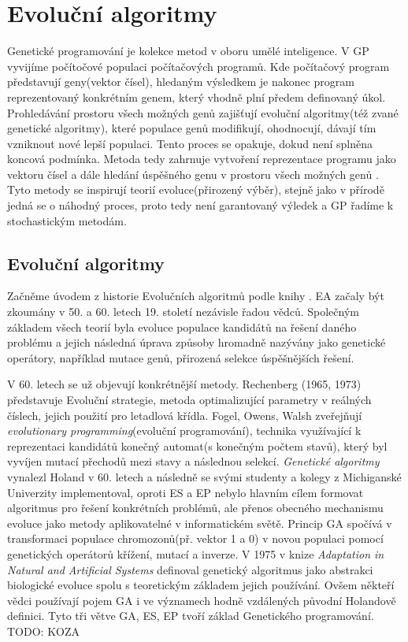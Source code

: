\chapter{Evoluční algoritmy}
Genetické programování je kolekce metod v oboru umělé inteligence. V  GP vyvijíme počítočové populaci počítačových programů. Kde počítačový program představují geny(vektor čísel), hledaným výsledkem je nakonec program reprezentovaný konkrétním genem, který vhodně plní předem definovaný úkol. Prohledávání prostoru všech možných genů zajišťují evoluční algoritmy(též zvané genetické algoritmy), které populace genů modifikují, ohodnocují, dávají tím vzniknout nové lepší populaci. Tento proces se opakuje, dokud není splněna koncová podmínka. Metoda tedy zahrnuje vytvoření reprezentace programu jako vektoru čísel a dále hledání úspěšného genu v prostoru všech možných genů \citep{field}. Tyto metody se inspirují teorií evoluce(přirozený výběr), stejně jako v přírodě jedná se o náhodný proces, proto tedy není garantovaný výledek a GP řadíme k stochastickým metodám. 
\section{Evoluční algoritmy}
Začněme úvodem z historie Evolučních algoritmů podle knihy \citep{MitchellBook}. EA začaly být zkoumány v 50. a 60. letech 19. století nezávisle řadou vědců. Společným základem všech teorií byla evoluce populace kandidátů na řešení daného problému a jejich následná úprava způsoby hromadně nazývány jako genetické operátory, například mutace genů, přirozená selekce úspěšnějších řešení. \par 
V 60. letech se už objevují konkrétnější metody. Rechenberg (1965, 1973) představuje Evoluční strategie, metoda optimalizující parametry v reálných číslech, jejich použití pro letadlová křídla. Fogel, Owens, Walsh zveřejňují \textit{evolutionary programming}(evoluční programování), technika využívající k reprezentaci kandidátů konečný automat(s konečným počtem stavů), který byl vyvíjen mutací přechodů mezi stavy a následnou selekcí. \textit{Genetické algoritmy} vynalezl Holand v 60. letech a následně se svými studenty a kolegy z Michiganské Univerzity implementoval, oproti ES a EP nebylo hlavním cílem formovat algoritmus pro řešení konkrétních problémů, ale přenos obecného mechanismu evoluce jako metody aplikovatelné v informatickém světě. Princip GA spočívá v transformaci populace chromozonů(př. vektor 1 a 0) v novou populaci pomocí genetických operátorů křížení, mutací a inverze. V 1975 v knize \textit{Adaptation in Natural and  Artificial Systems} \citep{HolandBook} definoval genetický algoritmus jako abstrakci biologické evoluce spolu s teoretickým základem jejich používání. Ovšem někteří vědci používají pojem GA i ve významech hodně vzdálených původní Holandově definici. Tyto tři větve GA, ES, EP tvoří základ Genetického programování. TODO: KOZA
